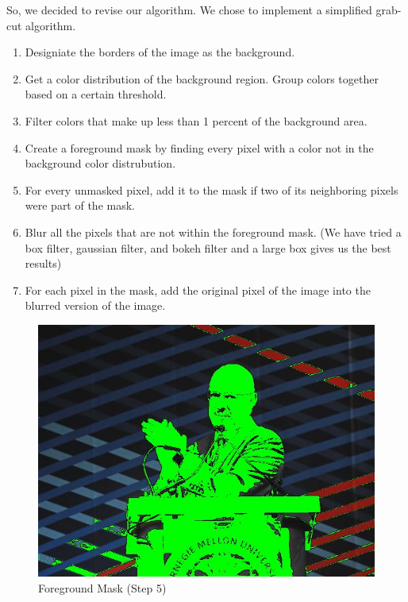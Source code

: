 \documentclass[12pt]{article}
\begin{document}
So, we decided to revise our algorithm. We chose to implement a simplified
grab-cut algorithm.
\begin{enumerate}
    \item
        Designiate the borders of the image as the background.
    \item
        Get a color distribution of the background region. Group colors together
        based on a certain threshold.
    \item
        Filter colors that make up less than 1 percent of the background area.
    \item
        Create a foreground mask by finding every pixel with a color not
        in the background color distrubution.
    \item
        For every unmasked pixel, add it to the mask if two of its neighboring
        pixels were part of the mask.
    \item
        Blur all the pixels that are not within the foreground mask. (We have
        tried a box filter, gaussian filter, and bokeh filter and a large box
        gives us the best results)
    \item
        For each pixel in the mask, add the original pixel of the image into
        the blurred version of the image.
\end{enumerate}

\begin{figure}[!htb]
    \begin{minipage}{0.48\textwidth}
        \centering
        \includegraphics[width=0.9\linewidth]{farnam_dude.jpg}
        \caption{Foreground Mask (Step 5)}
    \end{minipage}\hfill
\end{figure}
\end{document}
